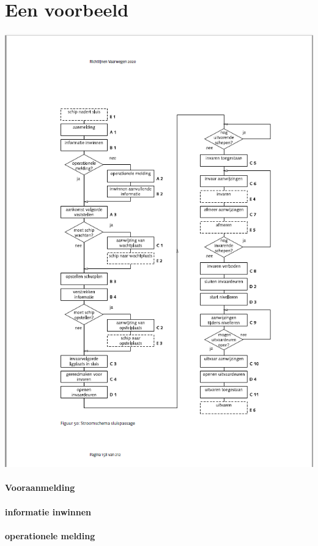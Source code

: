 \section{Een voorbeeld}

\includegraphics[scale=0.65]{sluispassage.png}

\paragraph{Vooraanmelding}


\paragraph{informatie inwinnen}


\paragraph{operationele melding}


